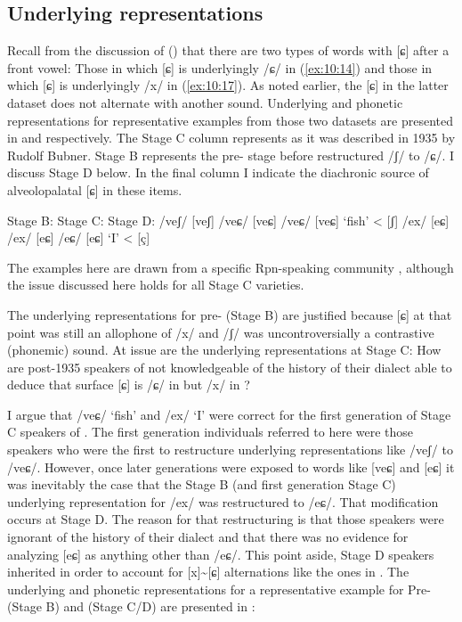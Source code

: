 \begin{xlist}
\subsection{Underlying representations}\label{sec:10.6.3}

Recall from the discussion of  () that there are two types of words with [ɕ] after a front vowel: Those in which [ɕ] is underlyingly /ɕ/ in (\ref{ex:10:14}) and those in which [ɕ] is underlyingly /x/ in (\ref{ex:10:17}). As noted earlier, the [ɕ] in the latter dataset does not alternate with another sound. Underlying and phonetic representations for representative examples from those two datasets are presented in  and  respectively. The Stage C column represents  as it was described in 1935 by Rudolf Bubner. Stage B represents the pre- stage before  restructured /ʃ/ to /ɕ/. I discuss Stage D below. In the final column I indicate the diachronic source of alveolopalatal [ɕ] in these items.

\ea%
\label{ex:10:41}
\begin{xlist}
\sn{} Stage B:    \tab    Stage C:      \tab  Stage D:     \tab
\ex\label{ex:10:41a}   /veʃ/  [veʃ] \tab    /veɕ/  [veɕ]  \tab  /veɕ/  [veɕ] \tab  ‘fish’ \tab  < [ʃ]
\ex\label{ex:10:41b}   /ex/    [eɕ] \tab    /ex/    [eɕ]  \tab  /eɕ/    [eɕ]  \tab  ‘I’   \tab  < [ç]
\end{xlist}
\z 

The examples here are drawn from a specific Rpn-speaking community \citep{Bubner1935}, although the issue discussed here holds for all Stage C varieties.

The underlying representations for pre- (Stage B) are justified because [ɕ] at that point was still an allophone of /x/ and /ʃ/ was uncontroversially a contrastive (phonemic) sound. At issue are the underlying representations at Stage C: How are post-1935 speakers of  not knowledgeable of the history of their dialect able to deduce that surface [ɕ] is /ɕ/ in  but /x/ in ?

I argue that /veɕ/ ‘fish’ and /ex/ ‘I’ were correct for the first generation of Stage C speakers of . The first generation individuals referred to here were those speakers who were the first to restructure underlying representations like /veʃ/ to /veɕ/. However, once later generations were exposed to words like [veɕ] and [eɕ] it was inevitably the case that the Stage B (and first generation Stage C) underlying representation for /ex/ was restructured to /eɕ/. That modification occurs at Stage D. The reason for that restructuring is that those speakers were ignorant of the history of their dialect and that there was no evidence for analyzing [eɕ] as anything other than /eɕ/. This point aside, Stage D speakers inherited  in order to account for [x]{\textasciitilde}[ɕ] alternations like the ones in . The underlying and phonetic representations for a representative example for Pre- (Stage B) and  (Stage C/D) are presented in :


\end{xlist}
